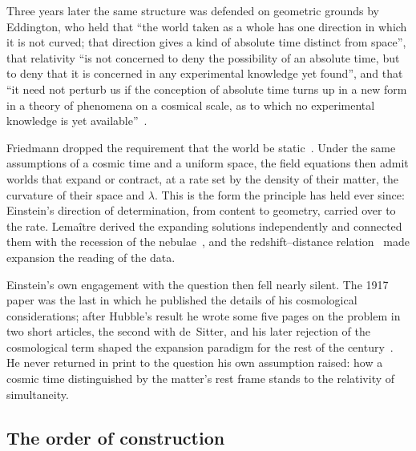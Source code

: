 \documentclass[aps,prd,reprint,amsmath,amssymb,superscriptaddress]{revtex4-2}
\begin{document}
Three years later the same structure was defended on geometric grounds by Eddington, who held that ``the world taken as a whole has one direction in which it is not curved; that direction gives a kind of absolute time distinct from space'', that relativity ``is not concerned to deny the possibility of an absolute time, but to deny that it is concerned in any experimental knowledge yet found'', and that ``it need not perturb us if the conception of absolute time turns up in a new form in a theory of phenomena on a cosmical scale, as to which no experimental knowledge is yet available''~\cite{Eddington1920}.

Friedmann dropped the requirement that the world be static~\cite{Friedmann1922, Friedmann1924}. Under the same assumptions of a cosmic time and a uniform space, the field equations then admit worlds that expand or contract, at a rate set by the density of their matter, the curvature of their space and $\lambda$. This is the form the principle has held ever since: Einstein's direction of determination, from content to geometry, carried over to the rate. Lema\^itre derived the expanding solutions independently and connected them with the recession of the nebulae~\cite{Lemaitre1927}, and the redshift--distance relation~\cite{Hubble1929} made expansion the reading of the data.

Einstein's own engagement with the question then fell nearly silent. The 1917 paper was the last in which he published the details of his cosmological considerations; after Hubble's result he wrote some five pages on the problem in two short articles, the second with de~Sitter, and his later rejection of the cosmological term shaped the expansion paradigm for the rest of the century~\cite{JanzenEinsteinCosmology}. He never returned in print to the question his own assumption raised: how a cosmic time distinguished by the matter's rest frame stands to the relativity of simultaneity.

\subsection{The order of construction}\label{sec:order}
\end{document}

